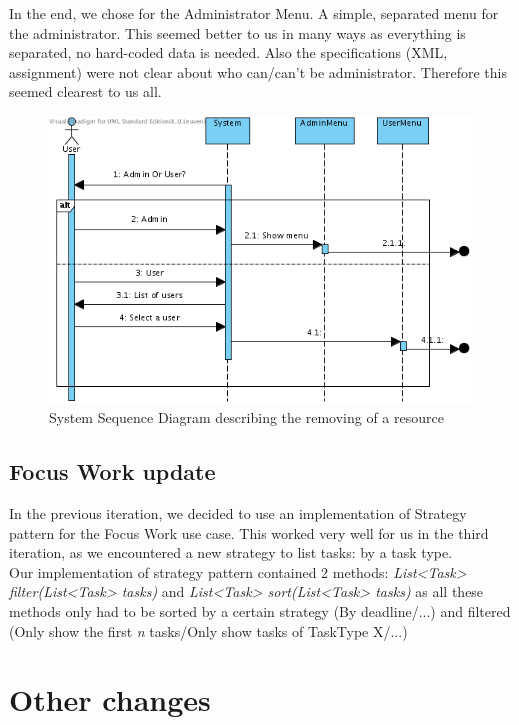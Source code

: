 			In the end, we chose for the Administrator Menu. A simple, separated menu for the administrator. This seemed better to us in many ways as everything is separated, no hard-coded data is needed. Also the specifications (XML, assignment) were not clear about who can/can't be administrator. Therefore this seemed clearest to us all.
			\begin{figure}[H]
				\begin{center}
					\includegraphics[scale=0.5]{images/ssd_log_in.png}
				\end{center}
				\caption{System Sequence Diagram describing the removing of a resource}
			\end{figure}
		\subsection{Focus Work update}
			In the previous iteration, we decided to use an implementation of Strategy pattern for the Focus Work use case. This worked very well for us in the third iteration, as we encountered a new strategy to list tasks: by a task type.\\
			Our implementation of strategy pattern contained 2 methods: \emph{List<Task> filter(List<Task> tasks)} and \emph{List<Task> sort(List<Task> tasks)} as all these methods only had to be sorted by a certain strategy (By deadline/...) and filtered (Only show the first \emph{n} tasks/Only show tasks of TaskType X/...)\\
				
	\section{Other changes}
